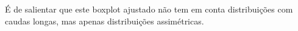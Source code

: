É de salientar que este boxplot ajustado não tem em conta distribuições com caudas longas, mas apenas distribuições assimétricas.
















































